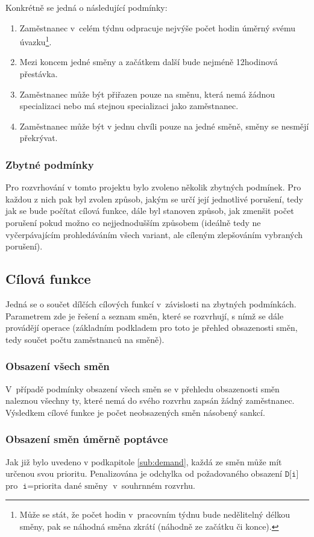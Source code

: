 \documentclass[twoside]{ctuthesis}
\begin{document}
Konkrétně se jedná o následující podmínky:

\begin{enumerate}
	\item Zaměstnanec v~celém týdnu odpracuje nejvýše počet hodin úměrný svému úvazku\footnote{Může se stát, že počet hodin v~pracovním týdnu bude nedělitelný délkou směny, pak se náhodná směna zkrátí (náhodně ze začátku či konce).}.
	\item Mezi koncem jedné směny a začátkem další bude nejméně 12hodinová přestávka.
	\item Zaměstnanec může být přiřazen pouze na směnu, která nemá žádnou specializaci nebo má stejnou specializaci jako zaměstnanec.
	\item Zaměstnanec může být v jednu chvíli pouze na jedné směně, směny se nesmějí překrývat.
\end{enumerate}

\subsubsection{Zbytné podmínky}
Pro rozvrhování v tomto projektu bylo zvoleno několik zbytných podmínek. Pro každou z nich pak byl zvolen způsob, jakým se určí její jednotlivé porušení, tedy jak se bude počítat cílová funkce, dále byl stanoven způsob, jak zmenšit počet porušení pokud možno co nejjednodušším způsobem (ideálně tedy ne vyčerpávajícím prohledáváním všech variant, ale cíleným zlepšováním vybraných porušení).

\subsection{Cílová funkce}
Jedná se o součet dílčích cílových funkcí v~závislosti na zbytných podmínkách. Parametrem zde je řešení a seznam směn, které se rozvrhují, s nímž se dále provádějí operace (základním podkladem pro toto je přehled obsazenosti směn, tedy součet počtu zaměstnanců na směně).

\subsubsection{Obsazení všech směn}
V~případě podmínky obsazení všech směn se v přehledu obsazenosti směn naleznou všechny ty, které nemá do svého rozvrhu zapsán žádný zaměstnanec. Výsledkem cílové funkce je počet neobsazených směn násobený sankcí.

\subsubsection{Obsazení směn úměrně poptávce}
Jak již bylo uvedeno v podkapitole \ref{sub:demand}, každá ze směn může mít určenou svou prioritu. Penalizována je odchylka od požadovaného obsazení $\texttt{D[i]}$ pro $\texttt{i} = \mbox{priorita dané směny}$ v~souhrnném rozvrhu.
\end{document}
